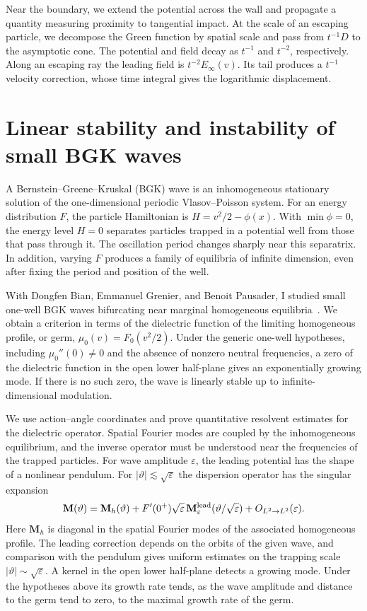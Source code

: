 \documentclass[reqno,10pt,letterpaper]{amsart}
\numberwithin{equation}{section}
\begin{document}
Near the boundary, we extend the potential across the wall and propagate a quantity measuring proximity to tangential impact. At the scale of an escaping particle, we decompose the Green function by spatial scale and pass from $t^{-1}D$ to the asymptotic cone. The potential and field decay as $t^{-1}$ and $t^{-2}$, respectively. Along an escaping ray the leading field is $t^{-2}E_\infty(v)$. Its tail produces a $t^{-1}$ velocity correction, whose time integral gives the logarithmic displacement.

\section{Linear stability and instability of small BGK waves}

A Bernstein--Greene--Kruskal (BGK) wave is an inhomogeneous stationary solution of the one-dimensional periodic Vlasov--Poisson system. For an energy distribution $F$, the particle Hamiltonian is $H=v^2/2-\phi(x)$. With $\min\phi=0$, the energy level $H=0$ separates particles trapped in a potential well from those that pass through it. The oscillation period changes sharply near this separatrix. In addition, varying $F$ produces a family of equilibria of infinite dimension, even after fixing the period and position of the well.

With Dongfen Bian, Emmanuel Grenier, and Benoit Pausader, I studied small one-well BGK waves bifurcating near marginal homogeneous equilibria~\cite{BGHP26}.  We obtain a criterion in terms of the dielectric function of the limiting homogeneous profile, or germ, $\mu_0(v)=F_0(v^2/2)$. Under the generic one-well hypotheses, including $\mu_0''(0)\ne0$ and the absence of nonzero neutral frequencies, a zero of the dielectric function in the open lower half-plane gives an exponentially growing mode. If there is no such zero, the wave is linearly stable up to infinite-dimensional modulation.

We use action--angle coordinates and prove quantitative resolvent estimates for the dielectric operator. Spatial Fourier modes are coupled by the inhomogeneous equilibrium, and the inverse operator must be understood near the frequencies of the trapped particles. For wave amplitude $\varepsilon$, the leading potential has the shape of a nonlinear pendulum. For $|\vartheta|\lesssim\sqrt{\varepsilon}$ the dispersion operator has the singular expansion
\[
 \mathbf M(\vartheta)=\mathbf M_h(\vartheta)+
 F'(0^+)\sqrt{\varepsilon}\,\mathbf M^{\rm lead}_{\varepsilon}
     (\vartheta/\sqrt{\varepsilon})+O_{L^2\to L^2}(\varepsilon).
\]
Here $\mathbf M_h$ is diagonal in the spatial Fourier modes of the associated homogeneous profile. The leading correction depends on the orbits of the given wave, and comparison with the pendulum gives uniform estimates on the trapping scale $|\vartheta|\sim\sqrt{\varepsilon}$. A kernel in the open lower half-plane detects a growing mode. Under the hypotheses above its growth rate tends, as the wave amplitude and distance to the germ tend to zero, to the maximal growth rate of the germ.
\end{document}
